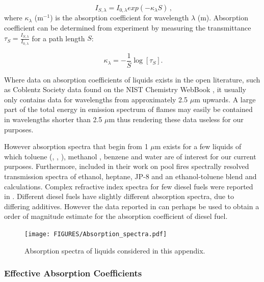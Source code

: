 \begin{equation}
\label{eqn_beerslaw}
\ I_{S,\lambda} = I_{0,\lambda} exp\left( -\kappa_\lambda S \right) \,\mbox{,}
\end{equation}
where $\kappa_{\lambda}$ (m$^{-1}$) is the absorption coefficient for wavelength $\lambda$ (m).  Absorption coefficient can be determined from experiment by measuring the transmittance $\tau_{S}=\frac{I_{S,\lambda}}{I_{0,\lambda}}$ for a path length $S$:

\begin{equation}
\label{eqn_klambda}
\ \kappa_\lambda = -\frac{1}{S} \log [\tau_S] \mbox{.}
\end{equation}

Where data on absorption coefficients of liquids exists in the open literature, such as Coblentz Society data found on the NIST Chemistry WebBook \cite{Coblentz:1}, it usually  only contains data for wavelengths from approximately 2.5 $\mu$m upwards. A large part of the total energy in emission spectrum of flames may easily be contained in wavelengths shorter than 2.5 $\mu$m thus rendering these data useless for our purposes.

However absorption spectra that begin from 1 $\mu$m exists for a few liquids of which toluene (\cite{Bertie:JMS2005}, \cite{Bertie:AS1994b}, \cite{Bertie:AS1994a}), methanol \cite{Bertie:AS1993a}, benzene \cite{Bertie:AS1993b} and water \cite{Bertie:AS1996} are of interest for our current purposes. Furthermore, \cite{Suo-Anttila:PCT2009} included in their work on pool fires spectrally resolved transmission spectra of ethanol, heptane, JP-8 and an ethanol-toluene blend and calculations. Complex refractive index spectra for few diesel fuels were reported in \cite{Sazhin:IJHMT2004b}. Different diesel fuels have slightly different absorption spectra, due to differing additives. However the data reported in \cite{Sazhin:IJHMT2004b} can perhaps be used to obtain a order of magnitude estimate for the absorption coefficient of diesel fuel.

\begin{figure}[ht]
    \label{fig_absspec}
    \centering
    \texttt{[image: FIGURES/Absorption\_spectra.pdf]}
    \caption{Absorption spectra of liquids considered in this appendix.}
\end{figure}

\subsubsection{Effective Absorption Coefficients}


